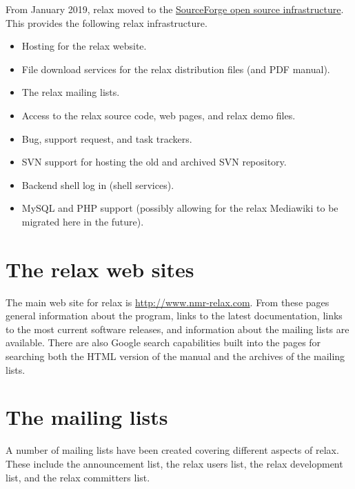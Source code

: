 From January 2019, relax moved to the \href{https://sourceforge.net/projects/nmr-relax/}{SourceForge open source infrastructure}.  This provides the following relax infrastructure.
\begin{itemize}
    \item Hosting for the relax website.
    \item File download services for the relax distribution files (and PDF manual).
    \item The relax mailing lists.
    \item Access to the relax source code, web pages, and relax demo files.
    \item Bug, support request, and task trackers.
    \item SVN support for hosting the old and archived SVN repository.
    \item Backend shell log in (shell services).
    \item MySQL and PHP support (possibly allowing for the relax Mediawiki to be migrated here in the future).
\end{itemize}




\section{The relax web sites}

The main web site for relax is \href{http://www.nmr-relax.com}{http://www.nmr-relax.com}.
From these pages general information about the program, links to the latest documentation, links to the most current software releases, and information about the mailing lists are available.
There are also Google search capabilities built into the pages for searching both the HTML version of the manual and the archives of the mailing lists.




\section{The mailing lists}\label{sect: relax mailing lists}

A number of mailing lists have been created covering different aspects of relax.
These include the announcement list, the relax users list, the relax development list, and the relax committers list.


